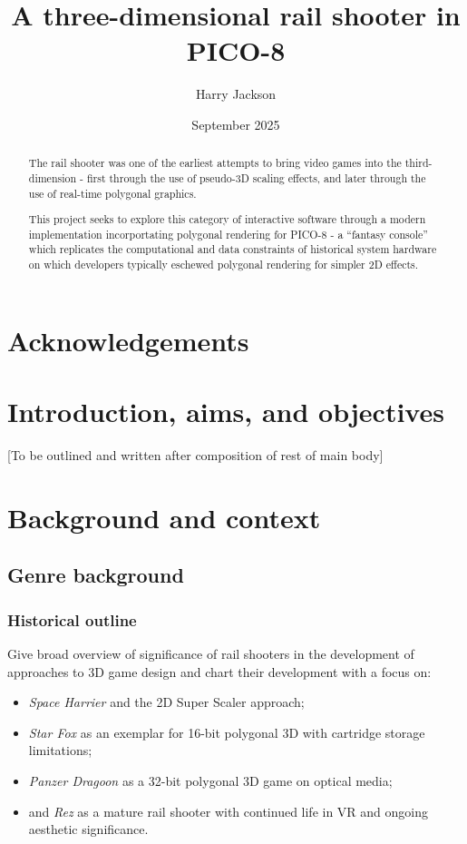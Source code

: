 \documentclass{article}
\title{A three-dimensional rail shooter in PICO-8}
\author{Harry Jackson}
\date{September 2025}
\begin{document}
\maketitle

\begin{abstract}
The rail shooter was one of the earliest attempts to bring video
games into the third-dimension - first through the use of pseudo-3D
scaling effects, and later through the use of real-time polygonal graphics.

This project seeks to explore this category of interactive software through a
modern implementation incorportating polygonal rendering for PICO-8 - a
``fantasy console'' which replicates the computational and data constraints of
historical system hardware on which developers typically eschewed polygonal
rendering for simpler 2D effects.
\end{abstract}

\section*{Acknowledgements}

\tableofcontents

\section{Introduction, aims, and objectives}
[To be outlined and written after composition of rest of main body]


\section{Background and context}

\subsection{Genre background}
\subsubsection*{Historical outline}
Give broad overview of significance of rail shooters in the development of approaches
to 3D game design and chart their development with a focus on:
\begin{itemize}
   \item\textit{Space Harrier} and the 2D Super Scaler approach;
   \item\textit{Star Fox} as an exemplar for 16-bit polygonal 3D with
   cartridge storage limitations;
   \item\textit{Panzer Dragoon} as a 32-bit polygonal 3D game on optical media;
   \item and \textit{Rez} as a mature rail shooter with continued life in VR and
   ongoing aesthetic significance.
\end{itemize}
\end{document}
